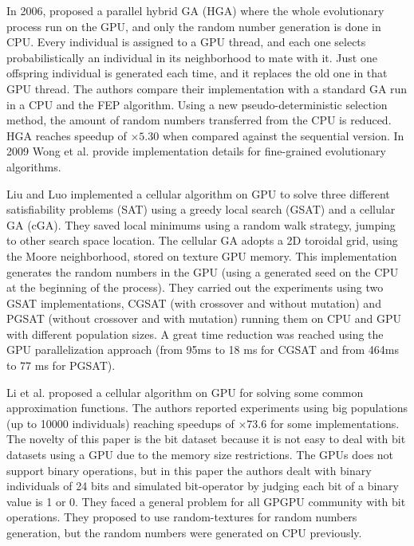\documentclass{article}
\begin{document}
In 2006, \cite{man-leung-wong-parallel-2006} proposed a parallel hybrid GA (HGA) where the whole evolutionary process run on the GPU, and only the random number generation is done in CPU. Every individual is assigned to a GPU thread, and each one selects probabilistically an individual in its neighborhood to mate with it. Just one offspring individual is generated each time, and it replaces the old one in that GPU thread. The authors compare their implementation with a standard GA run in a CPU and the FEP \cite{man-leung-wong-parallel-2005} algorithm. Using a new pseudo-deterministic selection method, the amount of random numbers transferred from the CPU is reduced. HGA reaches speedup of $\times5.30$ when compared against the sequential version. In 2009 Wong et al. \cite{wong-implementation-2009} provide implementation details for fine-grained evolutionary algorithms.

Liu and Luo \cite{zhongwen-luo-cellular-2006} implemented a cellular algorithm on GPU to solve three different satisfiability problems (SAT)
using a greedy local search (GSAT) \cite{Selman93domain-independentextensions} and a cellular GA (cGA).
They saved local minimums using a random walk strategy, jumping to other search space location.
The cellular GA adopts a 2D toroidal grid, using the Moore neighborhood, stored on texture GPU memory. This implementation generates the random numbers in the GPU (using a generated seed on the CPU at the beginning of the process). They carried out the experiments using two GSAT implementations, CGSAT (with crossover and without mutation) and PGSAT (without crossover and with mutation) running them on CPU and GPU with different population sizes. A great time reduction was reached using the GPU parallelization approach (from 95ms to 18 ms for CGSAT and from 464ms to 77 ms for PGSAT).

Li et al. \cite{jian_ming_li_efficient_2007} proposed a cellular algorithm on GPU for solving some common approximation functions. The authors reported experiments using big populations (up to 10000 individuals) reaching speedups of $\times73.6$ for some implementations. The novelty of this paper is the bit dataset because it is not easy to deal with bit datasets using a GPU due to the memory size restrictions. The GPUs does not support binary operations, but in this paper the authors dealt with binary individuals of 24 bits  and simulated bit-operator by judging each bit of a binary value is 1 or 0. They faced a general problem for all GPGPU community with bit operations. They proposed to use random-textures for random numbers generation, but the random numbers were generated on CPU previously.
\end{document}
